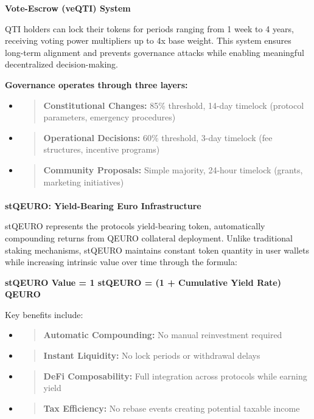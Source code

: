 \textbf{Vote-Escrow (veQTI) System}

QTI holders can lock their tokens for periods ranging from 1 week to 4
years, receiving voting power multipliers up to 4x base weight. This
system ensures long-term alignment and prevents governance attacks while
enabling meaningful decentralized decision-making.

\textbf{Governance operates through three layers:}

\begin{itemize}
\item
  \begin{quote}
  \textbf{Constitutional Changes:} 85\% threshold, 14-day timelock
  (protocol parameters, emergency procedures)
  \end{quote}
\item
  \begin{quote}
  \textbf{Operational Decisions:} 60\% threshold, 3-day timelock (fee
  structures, incentive programs)
  \end{quote}
\item
  \begin{quote}
  \textbf{Community Proposals:} Simple majority, 24-hour timelock
  (grants, marketing initiatives)
  \end{quote}
\end{itemize}

\hypertarget{section-2}{%
\paragraph{}\label{section-2}}

\textbf{stQEURO: Yield-Bearing Euro Infrastructure}

stQEURO represents the protocol\textquotesingle s yield-bearing token,
automatically compounding returns from QEURO collateral deployment.
Unlike traditional staking mechanisms, stQEURO maintains constant token
quantity in user wallets while increasing intrinsic value over time
through the formula:

\textbf{stQEURO Value = 1 stQEURO = (1 + Cumulative Yield Rate) QEURO}

Key benefits include:

\begin{itemize}
\item
  \begin{quote}
  \textbf{Automatic Compounding:} No manual reinvestment required
  \end{quote}
\item
  \begin{quote}
  \textbf{Instant Liquidity:} No lock periods or withdrawal delays
  \end{quote}
\item
  \begin{quote}
  \textbf{DeFi Composability:} Full integration across protocols while
  earning yield
  \end{quote}
\item
  \begin{quote}
  \textbf{Tax Efficiency:} No rebase events creating potential taxable
  income
  \end{quote}
\end{itemize}

